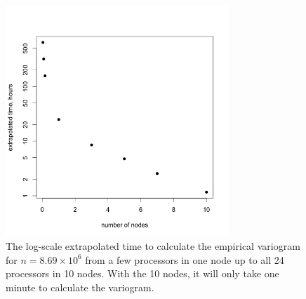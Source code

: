 \begin{figure}[!h]
   \centering
   \includegraphics[width=0.75\textwidth]{./fig/extrapolate.png} %
   \caption{The log-scale extrapolated time to calculate the empirical variogram for $n=8.69\times10^6$ from a few processors in one node up to all 24 processors in 10 nodes. With the 10 nodes, it will only take one minute to calculate the variogram.}
   \label{fig:extrapolate}
\end{figure}
